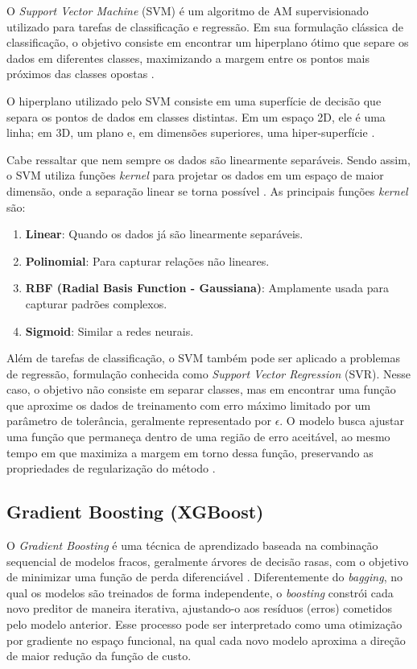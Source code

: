 O \textit{Support Vector Machine} (SVM) é um algoritmo de AM supervisionado utilizado para tarefas de classificação e regressão. 
Em sua formulação clássica de classificação, o objetivo consiste em encontrar um hiperplano ótimo que separe os dados em diferentes classes, 
maximizando a margem entre os pontos mais próximos das classes opostas \cite{noble2006}.

O hiperplano utilizado pelo SVM consiste em uma superfície de decisão que separa os pontos de dados em classes distintas. Em um espaço 2D, 
ele é uma linha; em 3D, um plano e, em dimensões superiores, uma hiper-superfície \cite{noble2006}.

Cabe ressaltar que nem sempre os dados são linearmente separáveis. Sendo assim, o SVM utiliza funções \textit{kernel} para projetar os 
dados em um espaço de maior dimensão, onde a separação linear se torna possível \cite{noble2006}. As principais funções \textit{kernel} são:

\begin{enumerate}
    \item \textbf{Linear}: Quando os dados já são linearmente separáveis.
    \item \textbf{Polinomial}: Para capturar relações não lineares.
    \item \textbf{RBF (Radial Basis Function - Gaussiana)}: Amplamente usada para capturar padrões complexos.
    \item \textbf{Sigmoid}: Similar a redes neurais.
\end{enumerate}

Além de tarefas de classificação, o SVM também pode ser aplicado a problemas de regressão, formulação conhecida como \textit{Support Vector Regression} (SVR). 
Nesse caso, o objetivo não consiste em separar classes, mas em encontrar uma função que aproxime os dados de treinamento com erro máximo limitado 
por um parâmetro de tolerância, geralmente representado por $\epsilon$. O modelo busca ajustar uma função que permaneça dentro de uma região de erro aceitável, 
ao mesmo tempo em que maximiza a margem em torno dessa função, preservando as propriedades de regularização do método \cite{Geron2019}.

\subsection{Gradient Boosting (XGBoost)}

O \textit{Gradient Boosting} é uma técnica de aprendizado baseada na combinação sequencial de modelos fracos, geralmente árvores de decisão rasas, 
com o objetivo de minimizar uma função de perda diferenciável \cite{Geron2019}. Diferentemente do \textit{bagging}, no qual os modelos são treinados 
de forma independente, o \textit{boosting} constrói cada novo preditor de maneira iterativa, ajustando-o aos resíduos (erros) cometidos pelo modelo anterior. 
Esse processo pode ser interpretado como uma otimização por gradiente no espaço funcional, na qual cada novo modelo 
aproxima a direção de maior redução da função de custo.


